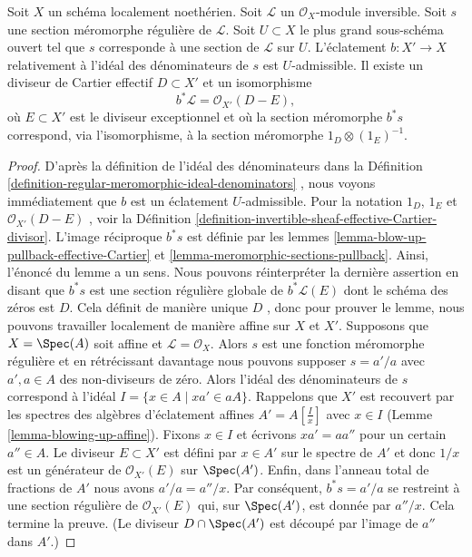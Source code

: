 \begin{lemma}
\label{lemma-blowing-up-denominators}
Soit  $X$  un schéma localement noethérien. Soit  $\mathcal{L}$  un
 $\mathcal{O}_X$-module inversible. Soit  $s$  une section méromorphe régulière
de  $\mathcal{L}$. Soit  $U \subset X$  le plus grand sous-schéma ouvert tel que
 $s$  corresponde à une section de  $\mathcal{L}$  sur  $U$.
L'éclatement  $b : X' \to X$  relativement à l'idéal des dénominateurs de  $s$  est
 $U$-admissible. Il existe un diviseur de Cartier effectif  $D \subset X'$  et
un isomorphisme
$$
b^*\mathcal{L} = \mathcal{O}_{X'}(D - E),
$$
où  $E \subset X'$  est le diviseur exceptionnel et où la section méromorphe
 $b^*s$  correspond, via l'isomorphisme, à la section méromorphe
 $1_D \otimes (1_E)^{-1}$.
\end{lemma}

\begin{proof}
D'après la définition de l'idéal des dénominateurs dans la Définition
 \ref{definition-regular-meromorphic-ideal-denominators} , nous voyons immédiatement que  $b$  est un éclatement
 $U$-admissible. Pour la notation  $1_D$,  $1_E$ et
 $\mathcal{O}_{X'}(D - E)$ , voir la Définition  \ref{definition-invertible-sheaf-effective-Cartier-divisor}. L'image réciproque
 $b^*s$  est définie par les lemmes  \ref{lemma-blow-up-pullback-effective-Cartier}  et  \ref{lemma-meromorphic-sections-pullback}.
Ainsi, l'énoncé du lemme a un sens. Nous pouvons réinterpréter la dernière
assertion en disant que  $b^*s$  est une section régulière globale de
 $b^*\mathcal{L}(E)$  dont le schéma des zéros est  $D$. Cela définit de manière
unique  $D$ , donc pour prouver le lemme, nous pouvons travailler
localement de manière affine sur  $X$  et  $X'$. Supposons que
 $X = \Spec(A)$  soit affine et  $\mathcal{L} = \mathcal{O}_X$. Alors  $s$  est une fonction
méromorphe régulière et en rétrécissant davantage nous pouvons supposer
 $s = a'/a$  avec  $a', a \in A$  des non-diviseurs de zéro. Alors l'idéal des
dénominateurs de  $s$  correspond à l'idéal  $I = \{x \in A \mid xa' \in aA\}$. Rappelons que
 $X'$  est recouvert par les spectres des algèbres d'éclatement affines
 $A' = A[\frac{I}{x}]$  avec  $x \in I$  (Lemme  \ref{lemma-blowing-up-affine}). Fixons  $x \in I$  et
écrivons  $xa' = a a''$  pour un certain  $a'' \in A$. Le diviseur  $E \subset X'$  est
défini par  $x \in A'$  sur le spectre de  $A'$  et donc  $1/x$  est un
générateur de  $\mathcal{O}_{X'}(E)$  sur  $\Spec(A')$. Enfin, dans l'anneau total de
fractions de  $A'$  nous avons  $a'/a = a''/x$. Par conséquent,  $b^*s = a'/a$  se
restreint à une section régulière de  $\mathcal{O}_{X'}(E)$  qui, sur
 $\Spec(A')$, est donnée par  $a''/x$. Cela termine la preuve. (Le diviseur
 $D \cap \Spec(A')$  est découpé par l'image de  $a''$  dans  $A'$.)
\end{proof}





